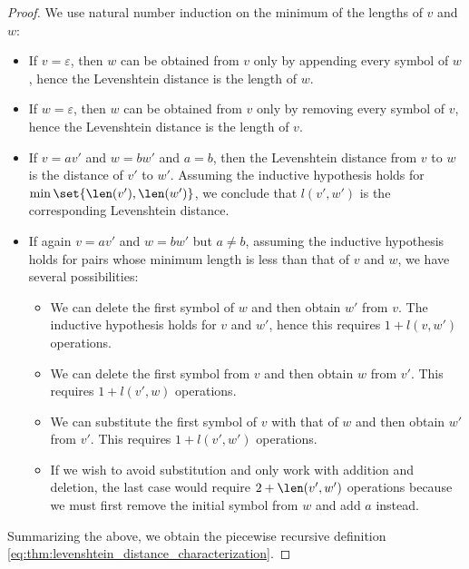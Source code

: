 \begin{proof}
  We use natural number induction on the minimum of the lengths of \( v \) and \( w \):
  \begin{itemize}
    \item If \( v = \varepsilon \), then \( w \) can be obtained from \( v \) only by appending every symbol of \( w \), hence the Levenshtein distance is the length of \( w \).

    \item If \( w = \varepsilon \), then \( w \) can be obtained from \( v \) only by removing every symbol of \( v \), hence the Levenshtein distance is the length of \( v \).

    \item If \( v = av' \) and \( w = bw' \) and \( a = b \), then the Levenshtein distance from \( v \) to \( w \) is the distance of \( v' \) to \( w' \). Assuming the inductive hypothesis holds for \( \min\set{ \len(v'), \len(w') } \), we conclude that \( l(v', w') \) is the corresponding Levenshtein distance.

    \item If again \( v = av' \) and \( w = bw' \) but \( a \neq b \), assuming the inductive hypothesis holds for pairs whose minimum length is less than that of \( v \) and \( w \), we have several possibilities:
    \begin{itemize}
      \item We can delete the first symbol of \( w \) and then obtain \( w' \) from \( v \). The inductive hypothesis holds for \( v \) and \( w' \), hence this requires \( 1 + l(v, w') \) operations.

      \item We can delete the first symbol from \( v \) and then obtain \( w \) from \( v' \). This requires \( 1 + l(v', w) \) operations.

      \item We can substitute the first symbol of \( v \) with that of \( w \) and then obtain \( w' \) from \( v' \). This requires \( 1 + l(v', w') \) operations.

      \item If we wish to avoid substitution and only work with addition and deletion, the last case would require \( 2 + \len(v', w') \) operations because we must first remove the initial symbol from \( w \) and add \( a \) instead.
    \end{itemize}
  \end{itemize}

  Summarizing the above, we obtain the piecewise recursive definition \eqref{eq:thm:levenshtein_distance_characterization}.
\end{proof}

